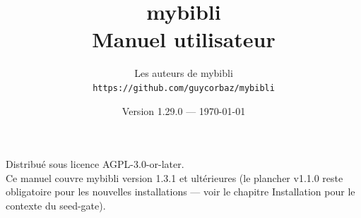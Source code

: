 \documentclass[a4paper,11pt,oneside]{book}
\title{\Huge\bfseries mybibli\\[6pt]\Large Manuel utilisateur}
\author{Les auteurs de mybibli\\\small \texttt{https://github.com/guycorbaz/mybibli}}
\date{Version 1.29.0 — \today}
\begin{document}
\frontmatter
\maketitle

\begin{center}
\vspace*{2cm}
\small
Distribué sous licence AGPL-3.0-or-later.\\
Ce manuel couvre mybibli version 1.3.1 et ultérieures (le plancher v1.1.0 reste obligatoire pour les nouvelles installations — voir le chapitre Installation pour le contexte du seed-gate).
\end{center}

\tableofcontents

\mainmatter

















\backmatter
\cleardoublepage
{}
\label{index}
\printindex
\end{document}
